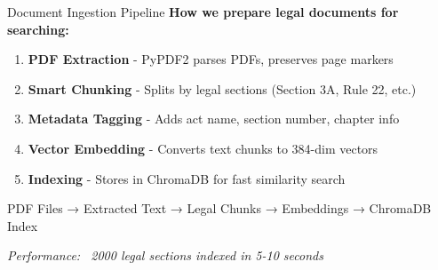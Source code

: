 \documentclass[11pt,aspectratio=16:9]{beamer}
\begin{document}
\begin{frame}{Document Ingestion Pipeline}
    \textbf{How we prepare legal documents for searching:}
    
    \vspace{0.5cm}
    
    \begin{enumerate}
        \item \textbf{PDF Extraction} - PyPDF2 parses PDFs, preserves page markers
        \item \textbf{Smart Chunking} - Splits by legal sections (Section 3A, Rule 22, etc.)
        \item \textbf{Metadata Tagging} - Adds act name, section number, chapter info
        \item \textbf{Vector Embedding} - Converts text chunks to 384-dim vectors
        \item \textbf{Indexing} - Stores in ChromaDB for fast similarity search
    \end{enumerate}
    
    \vspace{0.8cm}
    
    \begin{center}
        \small
        PDF Files → Extracted Text → Legal Chunks → Embeddings → ChromaDB Index
    \end{center}
    
    \vspace{0.5cm}
    {\small \textit{Performance: ~2000 legal sections indexed in 5-10 seconds}}
\end{frame}
\end{document}
